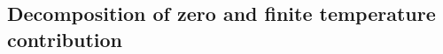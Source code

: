 \documentclass[sn-mathphys,Numbered]{sn-jnl}
\begin{document}

\subsection{Decomposition of zero and finite temperature contribution}
\label{Numerical}
\end{document}
